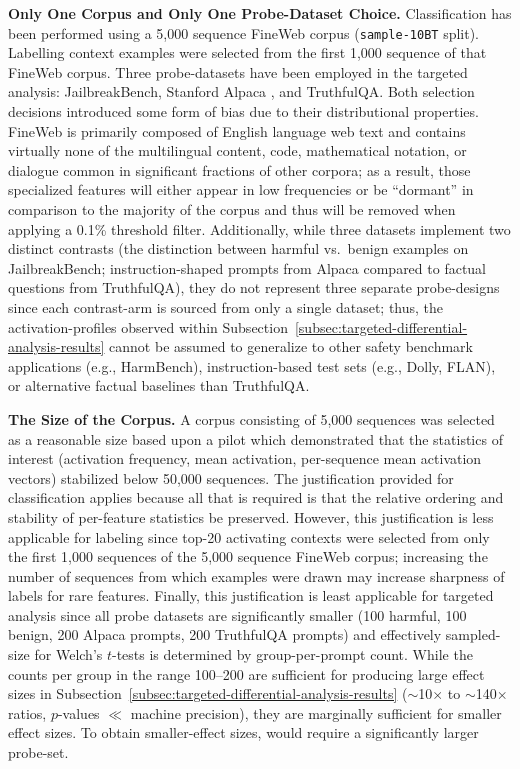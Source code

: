 \textbf{Only One Corpus and Only One Probe-Dataset Choice.} Classification has been performed using a 5,000 sequence FineWeb corpus \parencite{penedo_fineweb_2024} (\texttt{sample-10BT} split). Labelling context examples were selected from the first 1,000 sequence of that FineWeb corpus. Three probe-datasets have been employed in the targeted analysis: JailbreakBench, Stanford Alpaca \parencite{taori_stanford_alpaca_2023}, and TruthfulQA. Both selection decisions introduced some form of bias due to their distributional properties. FineWeb is primarily composed of English language web text and contains virtually none of the multilingual content, code, mathematical notation, or dialogue common in significant fractions of other corpora; as a result, those specialized features will either appear in low frequencies or be ``dormant'' in comparison to the majority of the corpus and thus will be removed when applying a 0.1\% threshold filter. Additionally, while three datasets implement two distinct contrasts (the distinction between harmful vs.\ benign examples on JailbreakBench; instruction-shaped prompts from Alpaca compared to factual questions from TruthfulQA), they do not represent three separate probe-designs since each contrast-arm is sourced from only a single dataset; thus, the activation-profiles observed within Subsection~\ref{subsec:targeted-differential-analysis-results} cannot be assumed to generalize to other safety benchmark applications (e.g., HarmBench), instruction-based test sets (e.g., Dolly, FLAN), or alternative factual baselines than TruthfulQA.

\textbf{The Size of the Corpus.} A corpus consisting of 5,000 sequences was selected as a reasonable size based upon a pilot which demonstrated that the statistics of interest (activation frequency, mean activation, per-sequence mean activation vectors) stabilized below 50,000 sequences. The justification provided for classification applies because all that is required is that the relative ordering and stability of per-feature statistics be preserved. However, this justification is less applicable for labeling since top-20 activating contexts were selected from only the first 1,000 sequences of the 5,000 sequence FineWeb corpus; increasing the number of sequences from which examples were drawn may increase sharpness of labels for rare features. Finally, this justification is least applicable for targeted analysis since all probe datasets are significantly smaller (100 harmful, 100 benign, 200 Alpaca prompts, 200 TruthfulQA prompts) and effectively sampled-size for Welch's $t$-tests is determined by group-per-prompt count. While the counts per group in the range 100--200 are sufficient for producing large effect sizes in Subsection~\ref{subsec:targeted-differential-analysis-results} ($\sim$10$\times$ to $\sim$140$\times$ ratios, $p$-values $\ll$ machine precision), they are marginally sufficient for smaller effect sizes. To obtain smaller-effect sizes, would require a significantly larger probe-set.

